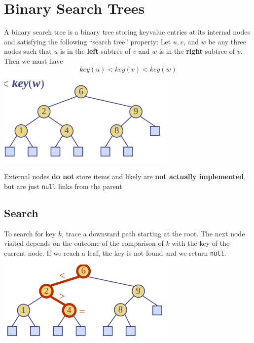 \documentclass{article}
\begin{document}
	\section{Binary Search Trees}
	\begin{flushleft}
		A binary search tree is a binary tree storing keyvalue entries at its internal nodes and satisfying the following “search tree” property: Let $u, v$, and $w$ be any three nodes such that $u$ is in the \textbf{left} subtree of $v$ and $w$ is in the \textbf{right} subtree of $v$. Then we must have
		\[ key(u) < key(v) < key(w) \]
	\end{flushleft}	
	\begin{center}
		\includegraphics[scale=0.5]{binary_search_tree.png}
	\end{center}
	\begin{flushleft}
		External nodes \textbf{do not} store items and likely are \textbf{not actually implemented}, but are just \texttt{null} links from the parent
	\end{flushleft}
	
	\subsection{Search}
	\begin{flushleft}
	To search for key $k$, trace a downward path starting at the root. The next node visited depends on the outcome of the comparison of $k$ with the key of the current node. If we reach a leaf, the key is not found and we return \texttt{null}.
	\end{flushleft}
	\begin{center}
		\includegraphics[scale=0.5]{binary_search_eg1.png}
	\end{center}
	
\end{document}
